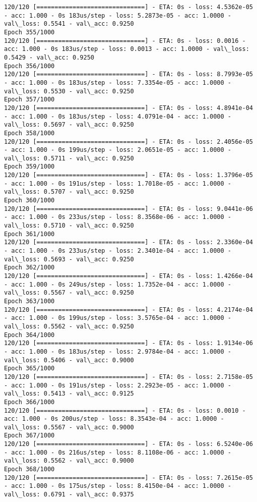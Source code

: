 \documentclass[11pt]{article}
\begin{document}
\begin{Verbatim}[commandchars=\\\{\}]
120/120 [==============================] - ETA: 0s - loss: 4.5362e-05 - acc: 1.000 - 0s 183us/step - loss: 5.2873e-05 - acc: 1.0000 - val\_loss: 0.5541 - val\_acc: 0.9250
Epoch 355/1000
120/120 [==============================] - ETA: 0s - loss: 0.0016 - acc: 1.000 - 0s 183us/step - loss: 0.0013 - acc: 1.0000 - val\_loss: 0.5429 - val\_acc: 0.9250
Epoch 356/1000
120/120 [==============================] - ETA: 0s - loss: 8.7993e-05 - acc: 1.000 - 0s 183us/step - loss: 7.3354e-05 - acc: 1.0000 - val\_loss: 0.5530 - val\_acc: 0.9250
Epoch 357/1000
120/120 [==============================] - ETA: 0s - loss: 4.8941e-04 - acc: 1.000 - 0s 183us/step - loss: 4.0791e-04 - acc: 1.0000 - val\_loss: 0.5697 - val\_acc: 0.9250
Epoch 358/1000
120/120 [==============================] - ETA: 0s - loss: 2.4056e-05 - acc: 1.000 - 0s 199us/step - loss: 2.0651e-05 - acc: 1.0000 - val\_loss: 0.5711 - val\_acc: 0.9250
Epoch 359/1000
120/120 [==============================] - ETA: 0s - loss: 1.3796e-05 - acc: 1.000 - 0s 191us/step - loss: 1.7018e-05 - acc: 1.0000 - val\_loss: 0.5707 - val\_acc: 0.9250
Epoch 360/1000
120/120 [==============================] - ETA: 0s - loss: 9.0441e-06 - acc: 1.000 - 0s 233us/step - loss: 8.3568e-06 - acc: 1.0000 - val\_loss: 0.5710 - val\_acc: 0.9250
Epoch 361/1000
120/120 [==============================] - ETA: 0s - loss: 2.3360e-04 - acc: 1.000 - 0s 233us/step - loss: 2.3401e-04 - acc: 1.0000 - val\_loss: 0.5693 - val\_acc: 0.9250
Epoch 362/1000
120/120 [==============================] - ETA: 0s - loss: 1.4266e-04 - acc: 1.000 - 0s 249us/step - loss: 1.7352e-04 - acc: 1.0000 - val\_loss: 0.5567 - val\_acc: 0.9250
Epoch 363/1000
120/120 [==============================] - ETA: 0s - loss: 4.2174e-04 - acc: 1.000 - 0s 199us/step - loss: 3.5765e-04 - acc: 1.0000 - val\_loss: 0.5562 - val\_acc: 0.9250
Epoch 364/1000
120/120 [==============================] - ETA: 0s - loss: 1.9134e-06 - acc: 1.000 - 0s 183us/step - loss: 2.9784e-04 - acc: 1.0000 - val\_loss: 0.5406 - val\_acc: 0.9000
Epoch 365/1000
120/120 [==============================] - ETA: 0s - loss: 2.7158e-05 - acc: 1.000 - 0s 191us/step - loss: 2.2923e-05 - acc: 1.0000 - val\_loss: 0.5413 - val\_acc: 0.9125
Epoch 366/1000
120/120 [==============================] - ETA: 0s - loss: 0.0010 - acc: 1.000 - 0s 200us/step - loss: 8.3543e-04 - acc: 1.0000 - val\_loss: 0.5567 - val\_acc: 0.9000
Epoch 367/1000
120/120 [==============================] - ETA: 0s - loss: 6.5240e-06 - acc: 1.000 - 0s 216us/step - loss: 8.1108e-06 - acc: 1.0000 - val\_loss: 0.5562 - val\_acc: 0.9000
Epoch 368/1000
120/120 [==============================] - ETA: 0s - loss: 7.2615e-05 - acc: 1.000 - 0s 175us/step - loss: 8.4150e-04 - acc: 1.0000 - val\_loss: 0.6791 - val\_acc: 0.9375

\end{Verbatim}
\end{document}
